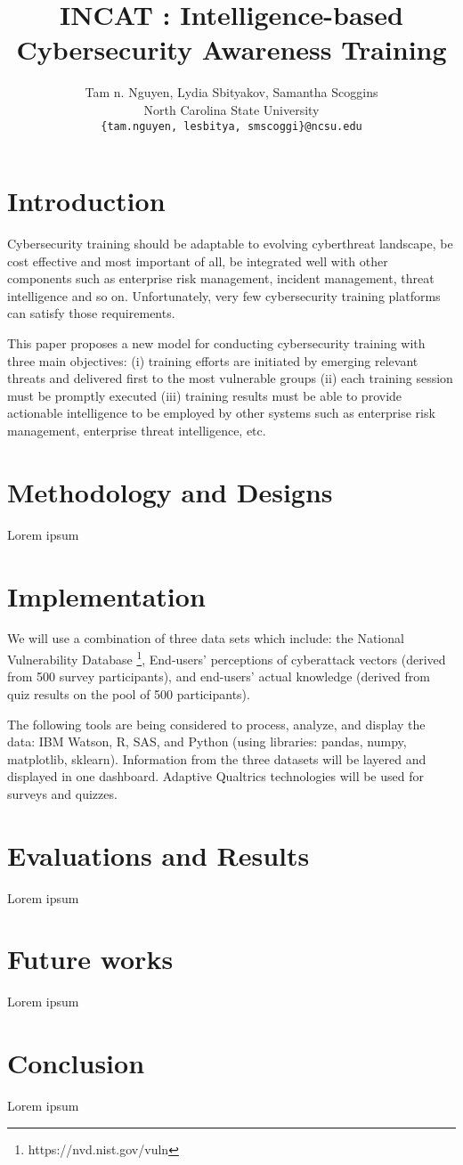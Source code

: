 \documentclass{article} %
\title{INCAT : Intelligence-based Cybersecurity Awareness Training}
\author{
Tam n. Nguyen, Lydia Sbityakov, Samantha Scoggins\\
North Carolina State University\\
\texttt{\{tam.nguyen, lesbitya, smscoggi\}@ncsu.edu} \\
}
\begin{document}
\maketitle

\section{Introduction}
Cybersecurity training should be adaptable to evolving cyberthreat landscape, be cost effective and most important of all, be integrated well with other components such as enterprise risk management, incident management, threat intelligence and so on. Unfortunately, very few cybersecurity training platforms can satisfy those requirements.

This paper proposes a new model for conducting cybersecurity training with three main objectives: (i) training efforts are initiated by emerging relevant threats and delivered first to the most vulnerable groups (ii) each training session must be
promptly executed (iii) training results must be able to provide actionable intelligence to be employed by other systems such as enterprise risk management, enterprise threat intelligence, etc.

\section{Methodology and Designs}
Lorem ipsum

\section{Implementation}
We will use a combination of three data sets which include: the National Vulnerability Database \footnote{https://nvd.nist.gov/vuln}, End-users' perceptions of cyberattack vectors (derived from 500 survey participants), and end-users' actual knowledge (derived from quiz results on the pool of 500 participants).

The following tools are being considered to process, analyze, and display the data: IBM Watson, R, SAS, and Python (using libraries:  pandas, numpy, matplotlib, sklearn).  Information from the three datasets will be layered and displayed in one dashboard.  Adaptive Qualtrics technologies will be used for surveys and quizzes.

\section{Evaluations and Results}
Lorem ipsum

\section{Future works}
Lorem ipsum

\section{Conclusion}
Lorem ipsum
\end{document}
